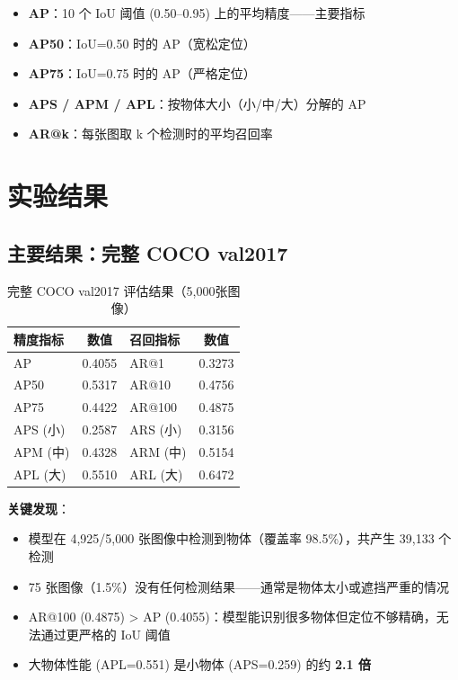 \documentclass[12pt,a4paper]{ctexart}
\begin{document}
\begin{itemize}
    \item \textbf{AP}：10 个 IoU 阈值 (0.50--0.95) 上的平均精度——主要指标
    \item \textbf{AP50}：IoU=0.50 时的 AP（宽松定位）
    \item \textbf{AP75}：IoU=0.75 时的 AP（严格定位）
    \item \textbf{APS / APM / APL}：按物体大小（小/中/大）分解的 AP
    \item \textbf{AR@k}：每张图取 k 个检测时的平均召回率
\end{itemize}

\section{实验结果}

\subsection{主要结果：完整 COCO val2017}

\begin{table}[H]
    \centering
    \caption{完整 COCO val2017 评估结果（5,000张图像）}
    \small
    \begin{tabular}{lclc}
        \toprule
        \textbf{精度指标} & \textbf{数值} & \textbf{召回指标} & \textbf{数值} \\
        \midrule
        AP & 0.4055 & AR@1 & 0.3273 \\
        AP50 & 0.5317 & AR@10 & 0.4756 \\
        AP75 & 0.4422 & AR@100 & 0.4875 \\
        APS (小) & 0.2587 & ARS (小) & 0.3156 \\
        APM (中) & 0.4328 & ARM (中) & 0.5154 \\
        APL (大) & 0.5510 & ARL (大) & 0.6472 \\
        \bottomrule
    \end{tabular}
\end{table}

\textbf{关键发现}：
\begin{itemize}
    \item 模型在 4,925/5,000 张图像中检测到物体（覆盖率 98.5\%），共产生 39,133 个检测
    \item 75 张图像（1.5\%）没有任何检测结果——通常是物体太小或遮挡严重的情况
    \item AR@100 (0.4875) > AP (0.4055)：模型能识别很多物体但定位不够精确，无法通过更严格的 IoU 阈值
    \item 大物体性能 (APL=0.551) 是小物体 (APS=0.259) 的约 \textbf{2.1 倍}
\end{itemize}
\end{document}
